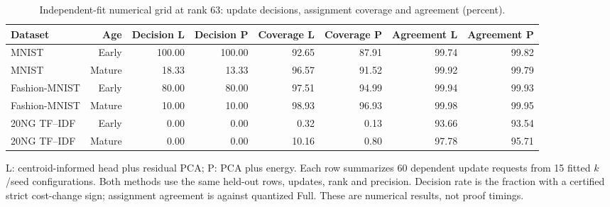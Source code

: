 \begin{table}[tp]
\centering
\small
\caption{Independent-fit numerical grid at rank 63: update decisions, assignment coverage and agreement (percent).}\label{tab:paired-native}
\begin{tabular}{lrrrrrrr}
\toprule
Dataset & Age & Decision L & Decision P & Coverage L & Coverage P & Agreement L & Agreement P \\
\midrule
MNIST & Early & 100.00 & 100.00 & 92.65 & 87.91 & 99.74 & 99.82 \\
MNIST & Mature & 18.33 & 13.33 & 96.57 & 91.52 & 99.92 & 99.79 \\
Fashion-MNIST & Early & 80.00 & 80.00 & 97.51 & 94.99 & 99.94 & 99.93 \\
Fashion-MNIST & Mature & 10.00 & 10.00 & 98.93 & 96.93 & 99.98 & 99.95 \\
20NG TF--IDF & Early & 0.00 & 0.00 & 0.32 & 0.13 & 93.66 & 93.54 \\
20NG TF--IDF & Mature & 0.00 & 0.00 & 10.16 & 0.80 & 97.78 & 95.71 \\
\bottomrule
\end{tabular}
\par\smallskip\begin{minipage}{0.98\linewidth}\footnotesize L: centroid-informed head plus residual PCA; P: PCA plus energy. Each row summarizes 60 dependent update requests from 15 fitted $k$/seed configurations. Both methods use the same held-out rows, updates, rank and precision. Decision rate is the fraction with a certified strict cost-change sign; assignment agreement is against quantized Full. These are numerical results, not proof timings.\end{minipage}
\end{table}
